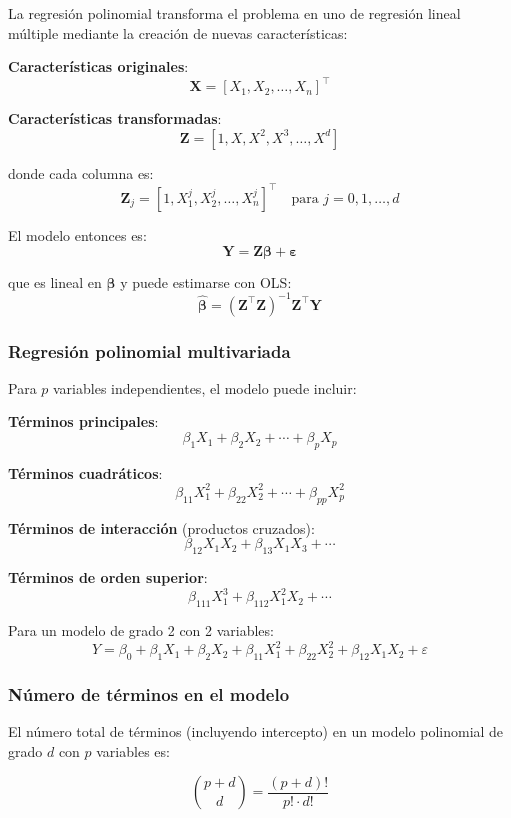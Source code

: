 \documentclass[
  doc,
  floatsintext,
  longtable,
  a4paper,
  nolmodern,
  notxfonts,
  notimes,
  12pt,
  colorlinks=true,linkcolor=blue,citecolor=blue,urlcolor=blue]{apa7}
\begin{document}
La regresión polinomial transforma el problema en uno de regresión
lineal múltiple mediante la creación de nuevas características:

\textbf{Características originales}: \[
\mathbf{X} = [X_1, X_2, \ldots, X_n]^\top
\]

\textbf{Características transformadas}: \[
\mathbf{Z} = [1, X, X^2, X^3, \ldots, X^d]
\]

donde cada columna es: \[
\mathbf{Z}_j = [1, X_1^j, X_2^j, \ldots, X_n^j]^\top \quad \text{para } j = 0, 1, \ldots, d
\]

El modelo entonces es: \[
\mathbf{Y} = \mathbf{Z}\boldsymbol{\beta} + \boldsymbol{\varepsilon}
\]

que es lineal en \(\boldsymbol{\beta}\) y puede estimarse con OLS: \[
\hat{\boldsymbol{\beta}} = (\mathbf{Z}^\top\mathbf{Z})^{-1}\mathbf{Z}^\top\mathbf{Y}
\]

\subsubsection{Regresión polinomial
multivariada}\label{regresiuxf3n-polinomial-multivariada}

Para \(p\) variables independientes, el modelo puede incluir:

\textbf{Términos principales}: \[
\beta_1 X_1 + \beta_2 X_2 + \cdots + \beta_p X_p
\]

\textbf{Términos cuadráticos}: \[
\beta_{11} X_1^2 + \beta_{22} X_2^2 + \cdots + \beta_{pp} X_p^2
\]

\textbf{Términos de interacción} (productos cruzados): \[
\beta_{12} X_1 X_2 + \beta_{13} X_1 X_3 + \cdots
\]

\textbf{Términos de orden superior}: \[
\beta_{111} X_1^3 + \beta_{112} X_1^2 X_2 + \cdots
\]

Para un modelo de grado 2 con 2 variables: \[
Y = \beta_0 + \beta_1 X_1 + \beta_2 X_2 + \beta_{11} X_1^2 + \beta_{22} X_2^2 + \beta_{12} X_1 X_2 + \varepsilon
\]

\subsubsection{Número de términos en el
modelo}\label{nuxfamero-de-tuxe9rminos-en-el-modelo}

El número total de términos (incluyendo intercepto) en un modelo
polinomial de grado \(d\) con \(p\) variables es:

\[
\binom{p + d}{d} = \frac{(p+d)!}{p! \cdot d!}
\]
\end{document}
